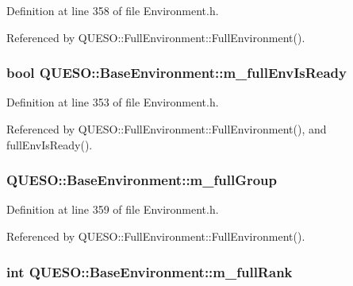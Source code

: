 Definition at line 358 of file Environment.\-h.



Referenced by Q\-U\-E\-S\-O\-::\-Full\-Environment\-::\-Full\-Environment().

\hypertarget{class_q_u_e_s_o_1_1_base_environment_a62020b48a3506aa067d1c94c461cb11e}{
\subsubsection[{m\-\_\-full\-Env\-Is\-Ready}]{\setlength{\rightskip}{0pt plus 5cm}bool Q\-U\-E\-S\-O\-::\-Base\-Environment\-::m\-\_\-full\-Env\-Is\-Ready\hspace{0.3cm}{\ttfamily [protected]}}}\label{class_q_u_e_s_o_1_1_base_environment_a62020b48a3506aa067d1c94c461cb11e}


Definition at line 353 of file Environment.\-h.



Referenced by Q\-U\-E\-S\-O\-::\-Full\-Environment\-::\-Full\-Environment(), and full\-Env\-Is\-Ready().

\hypertarget{class_q_u_e_s_o_1_1_base_environment_ad455ca08c81b8d953e9a8d2bb14d03c3}{
\subsubsection[{m\-\_\-full\-Group}]{ Q\-U\-E\-S\-O\-::\-Base\-Environment\-::m\-\_\-full\-Group\hspace{0.3cm}{\ttfamily [protected]}}}\label{class_q_u_e_s_o_1_1_base_environment_ad455ca08c81b8d953e9a8d2bb14d03c3}


Definition at line 359 of file Environment.\-h.



Referenced by Q\-U\-E\-S\-O\-::\-Full\-Environment\-::\-Full\-Environment().

\hypertarget{class_q_u_e_s_o_1_1_base_environment_a0bfa53f6bdaec0a6aa3dc00ee2c0101f}{
\subsubsection[{m\-\_\-full\-Rank}]{\setlength{\rightskip}{0pt plus 5cm}int Q\-U\-E\-S\-O\-::\-Base\-Environment\-::m\-\_\-full\-Rank\hspace{0.3cm}{\ttfamily [protected]}}}\label{class_q_u_e_s_o_1_1_base_environment_a0bfa53f6bdaec0a6aa3dc00ee2c0101f}


